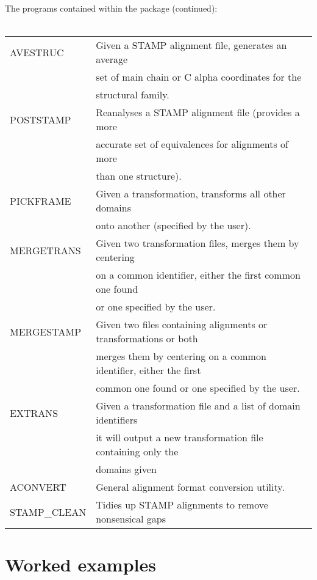 \newpage
The programs contained within the package (continued):\\
\\
\begin{center}
    \begin{tabular}{|ll|}
        \hline
        AVESTRUC & Given a STAMP alignment file, generates an average\\
        &    set of main chain or C alpha coordinates for the \\
        &    structural family.\\
        \hline
        POSTSTAMP & Reanalyses a STAMP alignment file (provides a more\\
        &   accurate set of equivalences for alignments of more\\
        &   than one structure).\\
        \hline
        PICKFRAME & Given a transformation, transforms all other domains \\ 
        &   onto another (specified by the user).\\
        \hline
        MERGETRANS & Given two transformation files, merges them by centering \\
        &  on a common identifier, either the first common one found\\
        &  or one specified by the user.\\
        \hline
        MERGESTAMP & Given two files containing alignments or transformations or both\\
        &  merges them by centering on a common identifier, either the first \\
        &  common one found or one specified by the user.\\
        \hline
        EXTRANS    & Given a transformation file and a list of domain identifiers \\
        &  it will output a new transformation file containing only the \\
        &  domains given \\
        \hline
        ACONVERT   & General alignment format conversion utility.\\
        \hline
        STAMP\_CLEAN & Tidies up STAMP alignments to remove nonsensical gaps\\
        \hline
    \end{tabular}
\end{center}


\chapter{Worked examples}
\label{worked_examples}

